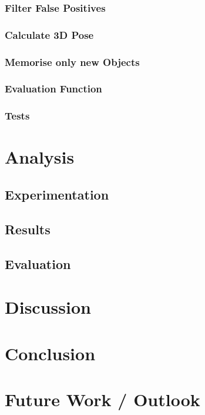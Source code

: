 \documentclass[11pt, twoside, a4paper]{report}
\begin{document}
\subsection{Filter False Positives}
\subsection{Calculate 3D Pose}
\subsection{Memorise only new Objects}
\subsection{Evaluation Function}
\subsection{Tests}


\chapter{Analysis}
\section{Experimentation}
\section{Results}
\section{Evaluation}


\chapter{Discussion}


\chapter{Conclusion}


\chapter{Future Work / Outlook}
\end{document}
